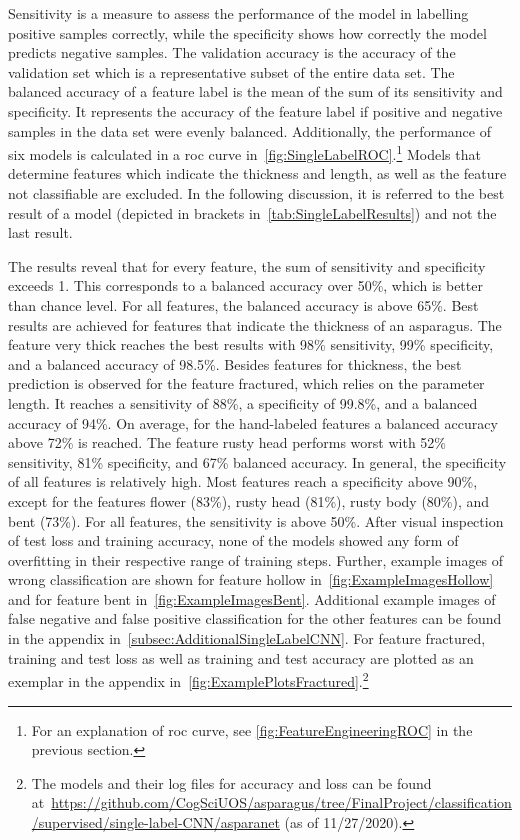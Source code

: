 Sensitivity is a measure to assess the performance of the model in labelling positive samples correctly, while the specificity shows how correctly the model predicts negative samples. The validation accuracy is the accuracy of the validation set which is a representative subset of the entire data set. The balanced accuracy of a feature label is the mean of the sum of its sensitivity and specificity. It represents the accuracy of the feature label if positive and negative samples in the data set were evenly balanced.
Additionally, the performance of six models is calculated in a \acrshort{roc} curve in~\autoref{fig:SingleLabelROC}.\footnote{For an explanation of \acrshort{roc} curve, see \autoref{fig:FeatureEngineeringROC} in the previous section.} Models that determine features which indicate the thickness and length, as well as the feature not classifiable are excluded.
In the following discussion, it is referred to the best result of a model (depicted in brackets in~\autoref{tab:SingleLabelResults}) and not the last result.

The results reveal that for every feature, the sum of sensitivity and specificity exceeds 1.  This corresponds to a balanced accuracy over 50\%, which is better than chance level. For all features, the balanced accuracy is above 65\%. Best results are achieved for features that indicate the thickness of an asparagus. The feature very thick reaches the best results with 98\% sensitivity, 99\% specificity, and a balanced accuracy of 98.5\%. Besides features for thickness, the best prediction is observed for the feature fractured, which relies on the parameter length. It reaches a sensitivity of 88\%, a specificity of 99.8\%, and a balanced accuracy of 94\%.
On average, for the hand-labeled features a balanced accuracy above 72\% is reached. The feature rusty head performs worst with 52\% sensitivity, 81\% specificity, and 67\% balanced accuracy. In general, the specificity of all features is relatively high. Most features reach a specificity above 90\%, except for the features flower (83\%), rusty head (81\%), rusty body (80\%), and bent (73\%). For all features, the sensitivity is above 50\%. After visual inspection of test loss and training accuracy, none of the models showed any form of overfitting in their respective range of training steps.
Further, example images of wrong classification are shown for feature hollow in~\autoref{fig:ExampleImagesHollow} and for feature bent in~\autoref{fig:ExampleImagesBent}. Additional example images of false negative and false positive classification for the other features can be found in the appendix in~\autoref{subsec:AdditionalSingleLabelCNN}. For feature fractured, training and test loss as well as training and test accuracy are plotted as an exemplar in the appendix in~\autoref{fig:ExamplePlotsFractured}.\footnote{The models and their log files for accuracy and loss can be found at~\url{https://github.com/CogSciUOS/asparagus/tree/FinalProject/classification/supervised/single-label-CNN/asparanet} (as of 11/27/2020).}
 
